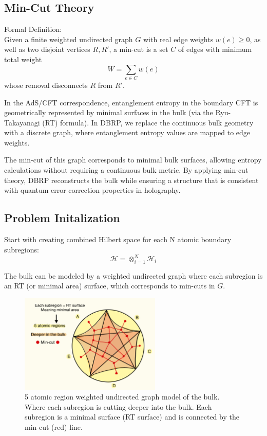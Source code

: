 \documentclass[12pt]{article}
\begin{document}
\subsection{Min-Cut Theory}
Formal Definition:
\\
Given a finite weighted undirected graph \( G \) with real edge weights \( w(e) \geq 0 \), as well as two disjoint vertices \( R, R' \), a min-cut is a set \( C \) of edges with minimum total weight
    \[
    W = \sum_{e \in C} w(e)
    \]
whose removal disconnects \( R \) from \( R' \).

In the AdS/CFT correspondence, entanglement entropy in the boundary CFT is geometrically represented by minimal surfaces in the bulk (via the Ryu-Takayanagi (RT) formula). In DBRP, we replace the continuous bulk geometry with a discrete graph, where entanglement entropy values are mapped to edge weights.

The min-cut of this graph corresponds to minimal bulk surfaces, allowing entropy calculations without requiring a continuous bulk metric. By applying min-cut theory, DBRP reconstructs the bulk while ensuring a structure that is consistent with quantum error correction properties in holography.


\subsection{Problem Initalization}
Start with creating combined Hilbert space for each N atomic boundary subregions:
\[
\mathcal{H} = \otimes^{N}_{i=1}\mathcal{H}_{i}
\]

The bulk can be modeled by a weighted undirected graph where each subregion is an RT (or minimal area) surface, which corresponds to min-cuts in \( G \).

\begin{figure}[htbp]  %
    \centering
    \includegraphics[width=0.6\textwidth, height=0.23\textheight]{mincut_graph.jpeg}  %
    \caption{5 atomic region weighted undirected graph model of the bulk. Where each subregion is cutting deeper into the bulk. Each subregion is a minimal surface (RT surface) and is connected by the min-cut (red) line.}  %
    \label{fig:mincut}  %
\end{figure}
\end{document}
